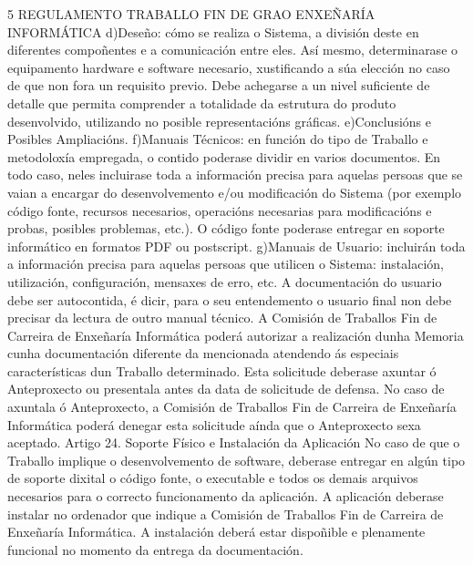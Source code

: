 5 REGULAMENTO TRABALLO FIN DE GRAO ENXEÑARÍA INFORMÁTICA 
d)Deseño:  cómo  se  realiza  o  Sistema,  a  división  deste  en  diferentes  compoñentes  e  a 
comunicación  entre  eles.  Así  mesmo,  determinarase  o  equipamento  hardware  e  software 
necesario, xustificando a súa elección no caso de que non fora un requisito previo. Debe achegarse 
a  un  nivel  suficiente  de  detalle  que  permita  comprender  a  totalidade  da  estrutura  do  produto 
desenvolvido, utilizando no posible representacións gráficas. 
e)Conclusións e Posibles Ampliacións. 
f)Manuais Técnicos: en función do tipo de Traballo e metodoloxía empregada, o contido poderase 
dividir  en  varios  documentos.  En  todo  caso,  neles  incluirase  toda  a  información  precisa  para 
aquelas persoas que se vaian a encargar do desenvolvemento e/ou modificación do Sistema (por 
exemplo  código  fonte,  recursos  necesarios,  operacións  necesarias  para  modificacións  e  probas, 
posibles problemas, etc.). O código fonte poderase entregar en soporte informático en formatos 
PDF ou postscript. 
g)Manuais  de  Usuario:  incluirán  toda  a  información  precisa  para  aquelas  persoas  que  utilicen  o 
Sistema:  instalación,  utilización,  configuración,  mensaxes  de  erro,  etc.  A  documentación  do 
usuario debe ser autocontida, é dicir, para o seu entendemento o usuario final non debe precisar 
da lectura de outro manual técnico. 
A  Comisión  de  Traballos  Fin  de  Carreira  de  Enxeñaría  Informática  poderá  autorizar  a  realización 
dunha  Memoria  cunha  documentación  diferente  da  mencionada  atendendo  ás  especiais 
características  dun  Traballo  determinado.  Esta  solicitude  deberase  axuntar  ó  Anteproxecto  ou 
presentala antes da data de solicitude de defensa. 
No  caso  de  axuntala  ó  Anteproxecto,  a  Comisión  de  Traballos  Fin  de  Carreira  de  Enxeñaría 
Informática poderá denegar esta solicitude aínda que o Anteproxecto sexa aceptado. 
Artigo 24. Soporte Físico e Instalación da Aplicación 
No caso de que o Traballo implique o desenvolvemento de software, deberase entregar en algún 
tipo de soporte dixital o código fonte, o executable e todos os demais arquivos necesarios para o 
correcto funcionamento da aplicación. 
A aplicación deberase instalar no ordenador que indique a Comisión de Traballos Fin de Carreira 
de  Enxeñaría  Informática.  A  instalación  deberá  estar  dispoñible  e  plenamente  funcional  no 
momento da entrega da documentación. 
 
